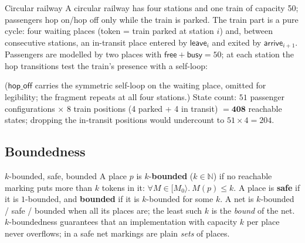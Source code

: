 \begin{examplebox}{Circular railway}
A circular railway has four stations and one train of capacity 50; passengers \textsf{hop on}/\textsf{hop off} only while the train is parked. The train part is a pure cycle: four \textsf{waiting} places (token = train parked at station $i$) and, between consecutive stations, an in-transit place entered by $\textsf{leave}_i$ and exited by $\textsf{arrive}_{i+1}$. Passengers are modelled by two places with $\textsf{free} + \textsf{busy} = 50$; at each station the hop transitions test the train's presence with a self-loop:
\begin{center}
\end{center}
($\textsf{hop\_off}$ carries the symmetric self-loop on the waiting place, omitted for legibility; the fragment repeats at all four stations.) State count: $51$ passenger configurations $\times$ $8$ train positions (4 parked + 4 in transit) $= \mathbf{408}$ reachable states; dropping the in-transit positions would undercount to $51 \times 4 = 204$.
\end{examplebox}

\subsection{Boundedness}

\begin{definitionbox}{$k$-bounded, safe, bounded}
A place $p$ is $k$-\textbf{bounded} ($k \in \mathbb{N}$) if no reachable marking puts more than $k$ tokens in it: $\forall M \in [M_0\rangle.\ M(p) \leq k$. A place is \textbf{safe} if it is $1$-bounded, and \textbf{bounded} if it is $k$-bounded for some $k$. A net is $k$-bounded / safe / bounded when all its places are; the least such $k$ is the \emph{bound} of the net. $k$-boundedness guarantees that an implementation with capacity $k$ per place never overflows; in a safe net markings are plain \emph{sets} of places.
\end{definitionbox}

